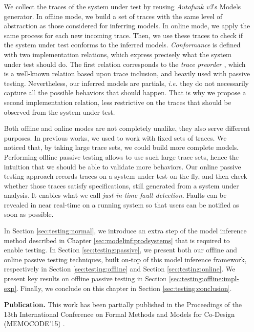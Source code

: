 We collect the traces of the system under test by reusing
\textit{Autofunk v3}'s Models generator. In offline mode, we
build a set of traces with the same level of abstraction as those
considered for inferring models. In online mode, we apply the
same process for each new incoming trace. Then, we use these
traces to check if the system under test conforms to the inferred
models. \emph{Conformance} is defined with two implementation
relations, which express precisely what the system under test
should do. The first relation corresponds to the \emph{trace
preorder} \cite{DNH84}, which is a well-known relation based upon
trace inclusion, and heavily used with passive testing.
Nevertheless, our inferred models are partials, \emph{i.e.} they
do not necessarily capture all the possible behaviors that should
happen. That is why we propose a second implementation relation,
less restrictive on the traces that should be observed from the
system under test.

Both offline and online modes are not completely unalike, they
also serve different purposes. In previous works, we used to work
with fixed sets of traces. We noticed that, by taking large trace
sets, we could build more complete models. Performing offline
passive testing allows to use such large trace sets, hence the
intuition that we should be able to validate more behaviors. Our
online passive testing approach records traces on a system under
test on-the-fly, and then check whether those traces satisfy
specifications, still generated from a system under analysis. It
enables what we call \emph{just-in-time fault detection}. Faults
can be revealed in near real-time on a running system so that
users can be notified as soon as possible.

In Section \ref{sec:testing:normal}, we introduce an extra step
of the model inference method described in Chapter
\ref{sec:modelinf:prodsystems} that is required to enable
testing. In Section \ref{sec:testing:passive}, we present both
our offline and online passive testing techniques, built on-top of
this model inference framework, respectively in Section
\ref{sec:testing:offline} and Section \ref{sec:testing:online}.
We present key results on offline passive testing in Section
\ref{sec:testing:offline:impl-exp}. Finally, we conclude on this
chapter in Section \ref{sec:testing:conclusion}.

\textbf{Publication.} This work has been partially published in
the Proceedings of the 13th International Conference on Formal
Methods and Models for Co-Design (MEMOCODE'15) \cite{7340480}.


